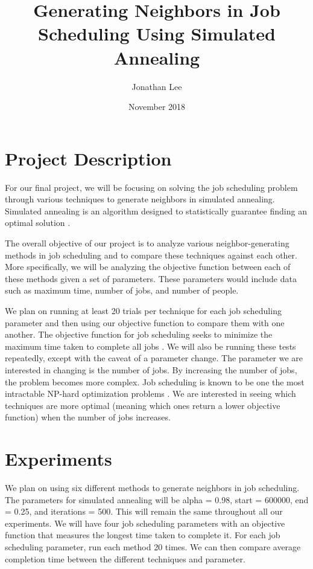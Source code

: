 \documentclass[11pt]{article}
\title{\vspace{-2.5cm} Generating Neighbors in Job Scheduling Using Simulated Annealing }
\author{Jonathan Lee}
\date{November 2018}
\begin{document}
\maketitle

\section{Project Description}

For our final project, we will be focusing on solving the job scheduling problem through various techniques to generate neighbors in simulated annealing. Simulated annealing is an algorithm designed to statistically guarantee finding an optimal solution \cite{ingber}.

The overall objective of our project is to analyze various neighbor-generating methods in job scheduling and to compare these techniques against each other. More specifically, we will be analyzing the objective function between each of these methods given a set of parameters. These parameters would include data such as maximum time, number of jobs, and number of people. 

We plan on running at least 20 trials per technique for each job scheduling parameter and then using our objective function to compare them with one another. The objective function for job scheduling seeks to minimize the maximum time taken to complete all jobs \cite{google}. We will also be running these tests repeatedly, except with the caveat of a parameter change. The parameter we are interested in changing is the number of jobs. By increasing the number of jobs, the problem becomes more complex. Job scheduling is known to be one the most intractable NP-hard optimization problems \cite{martin}. We are interested in seeing which techniques are more optimal (meaning which ones return a lower objective function) when the number of jobs increases. 


\section{Experiments}

We plan on using six different methods to generate neighbors in job scheduling. The parameters for simulated annealing will be alpha = 0.98, start = 600000, end = 0.25, and iterations = 500. This will remain the same throughout all our experiments. We will have four job scheduling parameters with an objective function that measures the longest time taken to complete it. For each job scheduling parameter, run each method 20 times. We can then compare average completion time between the different techniques and parameter. 
\end{document}
